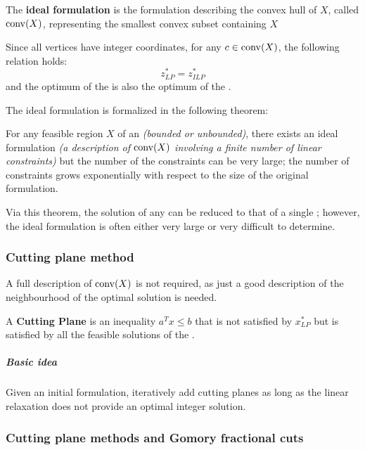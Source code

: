 \documentclass[english]{article}
\begin{document}
\begin{definition}
  The \textbf{ideal formulation} is the formulation describing the convex hull of \(X\), called \(\operatorname*{conv}(X)\), representing the smallest convex subset containing \(X\)
\end{definition}

Since all vertices have integer coordinates, for any \(c \in \operatorname*{conv}(X)\), the following relation holds:
\[ z^\ast_{LP} = z^\ast_{ILP} \]
and the optimum of the \LP is also the optimum of the \ILP.

The ideal formulation is formalized in the following theorem:

\begin{theorem}
  For any feasible region \(X\) of an \ILP \textit{(bounded or unbounded)}, there exists an ideal formulation \textit{(a description of \(\operatorname*{conv}(X)\) involving a finite number of linear constraints)} but the number of the constraints can be very large;
  the number of constraints grows exponentially with respect to the size of the original formulation.
\end{theorem}

Via this theorem, the solution of any \ILP can be reduced to that of a single \LP;
however, the ideal formulation is often either very large or very difficult to determine.

\subsubsection{Cutting plane method}

A full description of \(\operatorname*{conv}(X)\) is not required, as just a good description of the neighbourhood of the optimal solution is needed.

\begin{definition}
  A \textbf{Cutting Plane} is an inequality \(a^T x \leq b\) that is not satisfied by \(x^\ast_{LP}\) but is satisfied by all the feasible solutions of the \ILP.
\end{definition}

\subparagraph*{Basic idea} Given an initial formulation, iteratively add cutting planes as long as the linear relaxation does not provide an optimal integer solution.

\subsubsection{Cutting plane methods and Gomory fractional cuts}
\end{document}
